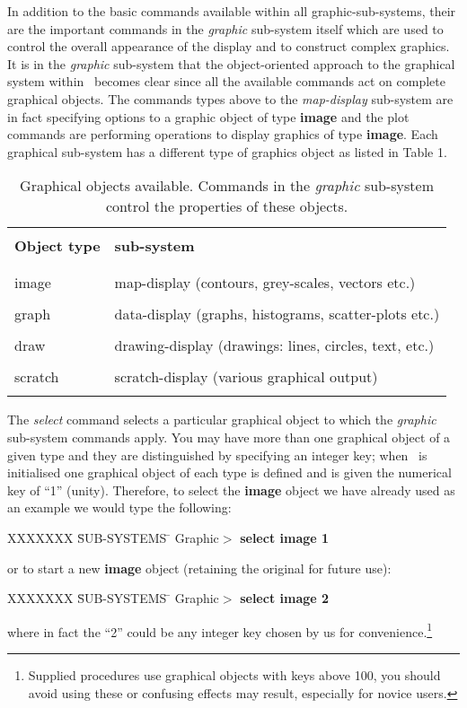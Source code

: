 In addition to the basic commands available within all graphic-sub-systems,
their are the important commands in the {\em graphic} sub-system
itself which are used to control the overall appearance of the display
and to construct complex graphics.  It is in the {\em graphic} sub-system
that the object-oriented approach to the graphical system within
\Anmap\ becomes clear since all the available commands act on complete
graphical objects.  The commands types above to the {\em map-display}
sub-system are in fact specifying options to a graphic object of type
{\bf image} and the plot commands are performing operations to display
graphics of type {\bf image}.  Each graphical sub-system has a different
type of graphics object as listed in Table 1.
\begin{table}
\begin{tabular}{|l||l|}
\hline
& \\
{\bf Object type} & {\bf sub-system} \\
& \\ \hline
& \\
image & map-display (contours, grey-scales, vectors etc.) \\
& \\
graph & data-display (graphs, histograms, scatter-plots etc.) \\
& \\
draw & drawing-display (drawings: lines, circles, text, etc.) \\
& \\
scratch & scratch-display (various graphical output) \\ 
& \\ \hline
\end{tabular}
\caption{Graphical objects available.  Commands in the
{\em graphic} sub-system control the properties of these objects.}
\end{table}

The {\em select} command selects a particular graphical object to
which the {\em graphic} sub-system commands apply.  You may have
more than one graphical object of a given type and they are
distinguished by specifying an integer key; when \Anmap\ is
initialised one graphical object of each type is defined and is
given the numerical key of ``1'' (unity).  Therefore, to select the
{\bf image} object we have already used as an example we would type
the following:
\begin{tabbing}
XXXXXXX \= SUB-SYSTEMS \= \kill
\> Graphic$>$ \> {\bf select image 1} \\
\end{tabbing}
or to start a new {\bf image} object (retaining the original for future
use):
\begin{tabbing}
XXXXXXX \= SUB-SYSTEMS \= \kill
\> Graphic$>$ \> {\bf select image 2} \\
\end{tabbing}
where in fact the ``2'' could be any integer key chosen by us for
convenience.\footnote{Supplied procedures use graphical objects with
keys above 100, you should avoid using these or confusing effects may
result, especially for novice users.}

